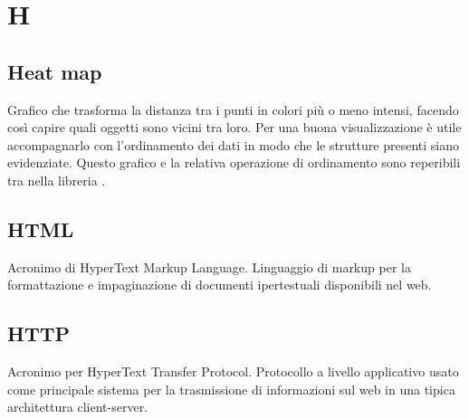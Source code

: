 \section*{H}
\markright{}
\subsection*{Heat map}
Grafico che trasforma la distanza tra i punti in colori più o meno intensi, facendo così capire quali oggetti sono vicini tra loro. Per una buona visualizzazione è utile accompagnarlo con l'ordinamento dei dati in modo che le strutture presenti siano evidenziate. Questo grafico e la relativa operazione di ordinamento sono reperibili tra nella libreria .

\subsection*{HTML}
Acronimo di HyperText Markup Language. Linguaggio di markup per la formattazione e impaginazione di documenti ipertestuali disponibili nel web.

\subsection*{HTTP}
Acronimo per HyperText Transfer Protocol. Protocollo a livello applicativo usato come principale sistema per la trasmissione di informazioni sul web in una tipica architettura client-server.
